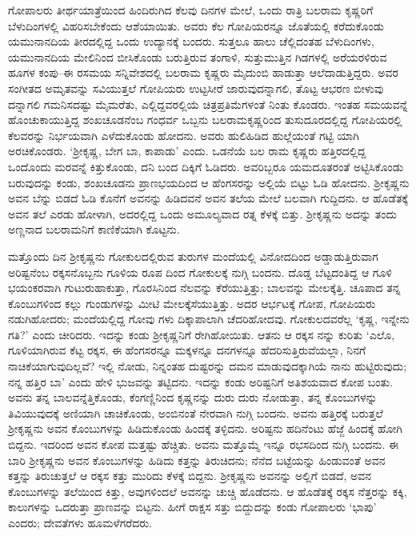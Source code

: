ಗೋಪಾಲರು ತೀರ್ಥಯಾತ್ರೆಯಿಂದ ಹಿಂದಿರುಗಿದ ಕೆಲವು ದಿನಗಳ ಮೇಲೆ, ಒಂದು ರಾತ್ರಿ ಬಲರಾಮ ಕೃಷ್ಣರಿಗೆ ಬೆಳುದಿಂಗಳಲ್ಲಿ ವಿಹರಿಸಬೇಕೆಂದು ಆಶೆಯಾಯಿತು. ಅವರು ಕೆಲ ಗೋಪಿಯರನ್ನೂ ಜೊತೆಯಲ್ಲಿ ಕರೆದುಕೊಂಡು ಯಮುನಾನದಿಯ ತೀರದಲ್ಲಿದ್ದ ಒಂದು ಉದ್ಯಾನಕ್ಕೆ ಬಂದರು. ಸುತ್ತಲೂ ಹಾಲು ಚೆಲ್ಲಿದಂತಹ ಬೆಳುದಿಂಗಳು, ಯಮುನಾನದಿಯ ಮೇಲಿನಿಂದ ಬೀಸಿಕೊಂಡು ಬರುತ್ತಿರುವ ತಂಗಾಳಿ, ಸುತ್ತುಮುತ್ತಿನ ಗಿಡಗಳಲ್ಲಿ ಅರೆಯರಳಿರುವ ಹೂಗಳ ಕಂಪು–ಈ ರಸಮಯ ಸನ್ನಿವೇಶದಲ್ಲಿ ಬಲರಾಮ ಕೃಷ್ಣರು ಮೈದುಂಬಿ ಹಾಡುತ್ತಾ ಆಲೆದಾಡುತ್ತಿದ್ದರು. ಅವರ ಸಂಗೀತದ ಅಮೃತವನ್ನು ಸವಿಯುತ್ತಲೆ ಗೋಪಿಯರು ಉಟ್ಟಸೀರೆ ಜಾರುವುದನ್ನಾಗಲಿ, ತೊಟ್ಟ ಆಭರಣ ಬೀಳುವು ದನ್ನಾಗಲಿ ಗಮನಿಸದಷ್ಟು ಮೈಮರೆತು, ಎಲ್ಲಿದ್ದವರಲ್ಲಿಯೆ ಚಿತ್ರಪ್ರತಿಮೆಗಳಂತೆ ನಿಂತು ಕೊಂಡರು. ಇಂತಹ ಸಮಯವನ್ನೆ ಹೊಂಚುಕಾಯುತ್ತಿದ್ದ ಶಂಖಚೂಡನೆಂಬ ಗಂಧರ್ವ ಒಬ್ಬನು ಬಲರಾಮಕೃಷ್ಣರಿಂದ ತುಸುದೂರದಲ್ಲಿದ್ದ ಗೋಪಿಯರಲ್ಲಿ ಕೆಲವರನ್ನು ನಿರ್ಭಯವಾಗಿ ಎಳೆದುಕೊಂಡು ಹೋದನು. ಅವರು ಹುಲಿಹಿಡಿದ ಹುಲ್ಲೆಯಂತೆ ಗಟ್ಟಿ ಯಾಗಿ ಅರಚಿಕೊಂಡರು. ‘ಶ್ರೀಕೃಷ್ಣ, ಬೇಗ ಬಾ, ಕಾಪಾಡು’ ಎಂದು. ಒಡನೆಯೆ ಬಲ ರಾಮ ಕೃಷ್ಣರು ಹತ್ತಿರದಲ್ಲಿದ್ದ ಒಂದೊಂದು ಮರವನ್ನೆ ಕಿತ್ತುಕೊಂಡು, ದನಿ ಬಂದ ದಿಕ್ಕಿಗೆ ಓಡಿದರು. ಅವರಿಬ್ಬರೂ ಯಮದೂತರಂತೆ ಅಟ್ಟಿಸಿಕೊಂಡು ಬರುವುದನ್ನು ಕಂಡು, ಶಂಖಚೂಡನು ಪ್ರಾಣಭಯದಿಂದ ಆ ಹೆಂಗಸರನ್ನು ಅಲ್ಲಿಯೆ ಬಿಟ್ಟು ಓಡಿ ಹೋದನು. ಶ್ರೀಕೃಷ್ಣನು ಅವನ ಬೆನ್ನು ಬಿಡದೆ ಓಡಿ ಕೊನೆಗೆ ಅವನನ್ನು ಹಿಡಿದವನೆ ಅವನ ತಲೆಯ ಮೇಲೆ ಬಲವಾಗಿ ಗುದ್ದಿದನು. ಆ ಹೊಡೆತಕ್ಕೆ ಅವನ ತಲೆ ಎರಡು ಹೋಳಾಗಿ, ಅದರಲ್ಲಿದ್ದ ಒಂದು ಅಮೂಲ್ಯವಾದ ರತ್ನ ಕೆಳಕ್ಕೆ ಬಿತ್ತು. ಶ್ರೀಕೃಷ್ಣನು ಅದನ್ನು ತಂದು ಅಣ್ಣನಾದ ಬಲರಾಮನಿಗೆ ಕಾಣಿಕೆಯಾಗಿ ಕೊಟ್ಟನು.

ಮತ್ತೊಂದು ದಿನ ಶ್ರೀಕೃಷ್ಣನು ಗೋಕುಲದಲ್ಲಿರುವ ತುರುಗಳ ಮಂದೆಯಲ್ಲಿ ವಿನೋದದಿಂದ ಅಡ್ಡಾಡುತ್ತಿರುವಾಗ ಅರಿಷ್ಟನೆಂಬ ರಕ್ಕಸನೊಬ್ಬನು ಗೂಳಿಯ ರೂಪ ದಿಂದ ಗೋಕುಲಕ್ಕೆ ನುಗ್ಗಿ ಬಂದನು. ದೊಡ್ಡ ಬೆಟ್ಟದಂತಿದ್ದ ಆ ಗೂಳಿ ಭಯಂಕರವಾಗಿ ಗುಟುರುಹಾಕುತ್ತಾ, ಗೊರಸಿನಿಂದ ನೆಲವನ್ನು ಕೆರೆಯುತ್ತಿತ್ತು; ಬಾಲವನ್ನು ಮೇಲಕ್ಕೆತ್ತಿ. ಚೂಪಾದ ತನ್ನ ಕೊಂಬುಗಳಿಂದ ಕಲ್ಲು ಗುಂಡುಗಳನ್ನು ಮೀಟಿ ಮೇಲಕ್ಕೆಸೆಯುತ್ತಿತ್ತು. ಅದರ ಆರ್ಭಟಕ್ಕೆ ಗೋಪ, ಗೋಪಿಯರು ನಡುಗಿಹೋದರು; ಮಂದೆಯಲ್ಲಿದ್ದ ಗೋವು ಗಳು ದಿಕ್ಕಾಪಾಲಾಗಿ ಚೆದರಿಹೋದವು. ಗೋಕುಲದವರೆಲ್ಲ ‘ಕೃಷ್ಣ, ಇನ್ನೇನು ಗತಿ?’ ಎಂದು ಚೀರಿದರು. ಇದನ್ನು ಕಂಡು ಶ್ರೀಕೃಷ್ಣನಿಗೆ ರೇಗಿಹೋಯಿತು. ಆತನು ಆ ರಕ್ಕಸ ನನ್ನು ಕುರಿತು ‘ಎಲೊ, ಗೂಳಿಯಾಗಿರುವ ಕೆಟ್ಟ ರಕ್ಕಸ, ಈ ಹೆಂಗಸರನ್ನೂ ಮಕ್ಕಳನ್ನೂ ದನಗಳನ್ನೂ ಹೆದರಿಸುತ್ತಿರುವೆಯಲ್ಲಾ, ನಿನಗೆ ನಾಚಿಕೆಯಾಗುವುದಿಲ್ಲವೆ? ಇಲ್ಲಿ ನೋಡು, ನಿನ್ನಂತಹ ದುಷ್ಟರನ್ನು ದಮನ ಮಾಡುವುದಕ್ಕಾಗಿಯೆ ನಾನು ಹುಟ್ಟಿರುವುದು; ನನ್ನ ಹತ್ತಿರ ಬಾ’ ಎಂದು ಹೇಳಿ ಭುಜವನ್ನು ತಟ್ಟಿದನು. ಇದನ್ನು ಕಂಡು ಅರಿಷ್ಟನಿಗೆ ಅತಿಶಯವಾದ ಕೋಪ ಬಂತು. ಅವನು ತನ್ನ ಬಾಲವನ್ನೆತ್ತಿಕೊಂಡು, ಕೆಂಗಣ್ಣಿನಿಂದ ಕೃಷ್ಣನನ್ನು ದುರು ದುರು ನೋಡುತ್ತಾ, ತನ್ನ ಕೊಂಬುಗಳನ್ನು ತಿವಿಯುವುದಕ್ಕೆ ಅಣಿಯಾಗಿ ಚಾಚಿಕೊಂಡು, ಅಂಬಿನಂತೆ ನೇರವಾಗಿ ನುಗ್ಗಿ ಬಂದನು. ಅವನು ಹತ್ತಿರಕ್ಕೆ ಬರುತ್ತಲೆ ಶ್ರೀಕೃಷ್ಣನು ಅವನ ಕೊಂಬುಗಳನ್ನು ಹಿಡಿದುಕೊಂಡು ಹಿಂದಕ್ಕೆ ತಳ್ಳಿದನು. ಅರಿಷ್ಟನು ಹದಿನೆಂಟು ಹೆಜ್ಜೆ ಹಿಂದಕ್ಕೆ ಹೋಗಿ ಬಿದ್ದನು. ಇದರಿಂದ ಅವನ ಕೋಪ ಮತ್ತಷ್ಟು ಹೆಚ್ಚಿತು. ಅವನು ಮತ್ತೊಮ್ಮೆ ಇನ್ನೂ ರಭಸದಿಂದ ನುಗ್ಗಿ ಬಂದನು. ಈ ಬಾರಿ ಶ್ರೀಕೃಷ್ಣನು ಅವನ ಕೊಂಬುಗಳನ್ನು ಹಿಡಿದು ಕತ್ತನ್ನು ತಿರುಚಿದನು; ನೆನೆದ ಬಟ್ಟೆಯನ್ನು ಹಿಂಡುವಂತೆ ಅವನ ಕತ್ತನ್ನು ತಿರುಚುತ್ತಲೆ ಆ ರಕ್ಕಸ ಕತ್ತು ಮುರಿದು ಕೆಳಕ್ಕೆ ಬಿದ್ದನು. ಶ್ರೀಕೃಷ್ಣನು ಅವನನ್ನು ಅಲ್ಲಿಗೆ ಬಿಡದೆ, ಅವನ ಕೊಂಬುಗಳನ್ನು ತಲೆಯಿಂದ ಕಿತ್ತು, ಅವುಗಳಿಂದಲೆ ಅವನನ್ನು ಚುಚ್ಚಿ ಹೊಡೆದನು. ಆ ಹೊಡೆತಕ್ಕೆ ರಕ್ಕಸ ನೆತ್ತರನ್ನು ಕಕ್ಕಿ, ಕಾಲುಗಳನ್ನು ಒದರುತ್ತಾ ಪ್ರಾಣವನ್ನು ಬಿಟ್ಟನು. ಹೀಗೆ ರಾಕ್ಷಸ ಸತ್ತು ಬಿದ್ದುದನ್ನು ಕಂಡು ಗೋಪಾಲರು ‘ಭಾಪು’ ಎಂದರು; ದೇವತೆಗಳು ಹೂಮಳೆಗರೆದರು.


